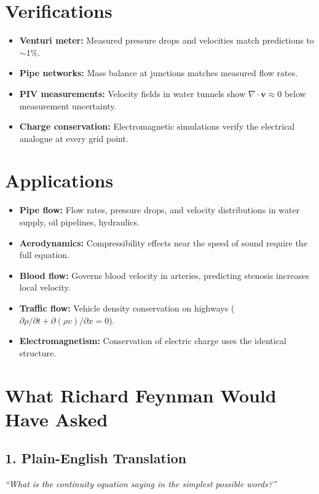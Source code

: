 \section*{Verifications}

\begin{itemize}
\item \textbf{Venturi meter:} Measured pressure drops and velocities match predictions to $\sim$1\%.
\item \textbf{Pipe networks:} Mass balance at junctions matches measured flow rates.
\item \textbf{PIV measurements:} Velocity fields in water tunnels show $\nabla \cdot \mathbf{v} \approx 0$ below measurement uncertainty.
\item \textbf{Charge conservation:} Electromagnetic simulations verify the electrical analogue at every grid point.
\end{itemize}
\section*{Applications}

\begin{itemize}
\item \textbf{Pipe flow:} Flow rates, pressure drops, and velocity distributions in water supply, oil pipelines, hydraulics.
\item \textbf{Aerodynamics:} Compressibility effects near the speed of sound require the full equation.
\item \textbf{Blood flow:} Governs blood velocity in arteries, predicting stenosis increases local velocity.
\item \textbf{Traffic flow:} Vehicle density conservation on highways ($\partial \rho / \partial t + \partial (\rho v) / \partial x = 0$).
\item \textbf{Electromagnetism:} Conservation of electric charge uses the identical structure.
\end{itemize}
\section*{What Richard Feynman Would Have Asked}

\subsection*{1. Plain-English Translation}
\textit{``What is the continuity equation saying in the simplest possible words?''}

